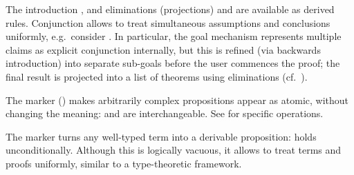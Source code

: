 \begin{isabellebody}
\begin{isamarkuptext}
  The introduction , and eliminations
  (projections)  and  are
  available as derived rules.  Conjunction allows to treat
  simultaneous assumptions and conclusions uniformly, e.g.\ consider
  .  In particular, the goal mechanism
  represents multiple claims as explicit conjunction internally, but
  this is refined (via backwards introduction) into separate sub-goals
  before the user commences the proof; the final result is projected
  into a list of theorems using eliminations (cf.\
  ).

  The  marker () makes arbitrarily complex
  propositions appear as atomic, without changing the meaning:  and  are interchangeable.  See
  \secref{sec:tactical-goals} for specific operations.

  The  marker turns any well-typed term into a derivable
  proposition:  holds unconditionally.  Although
  this is logically vacuous, it allows to treat terms and proofs
  uniformly, similar to a type-theoretic framework.


\end{isamarkuptext}
\end{isabellebody}
